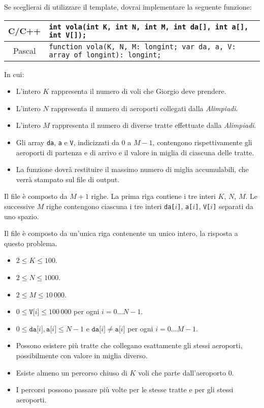 Se sceglierai di utilizzare il template, dovrai implementare la seguente funzione:
\begin{center}\begin{tabularx}{\textwidth}{|c|X|}
\hline
C/C++  & \verb|int vola(int K, int N, int M, int da[], int a[], int V[]);|\\
\hline
Pascal & \verb|function vola(K, N, M: longint; var da, a, V: array of longint): longint;|\\
\hline
\end{tabularx}\end{center}
In cui:
\begin{itemize}[nolistsep]
  \item L'intero $K$ rappresenta il numero di voli che Giorgio deve prendere.
  \item L'intero $N$ rappresenta il numero di aeroporti collegati dalla \emph{Alimpiadi}.
  \item L'intero $M$ rappresenta il numero di diverse tratte effettuate dalla \emph{Alimpiadi}.
  \item Gli array \texttt{da}, \texttt{a} e \texttt{V}, indicizzati da $0$ a $M-1$, contengono rispettivamente gli aeroporti di partenza e di arrivo e il valore in miglia di ciascuna delle tratte.
  \item La funzione dovrà restituire il massimo numero di miglia accumulabili, che verrà stampato sul file di output.
\end{itemize}

\InputFile
Il file  è composto da $M+1$ righe. La prima riga contiene i tre interi $K$, $N$, $M$. Le successive $M$ righe contengono ciascuna i tre interi \texttt{da[$i$]}, \texttt{a[$i$]}, \texttt{V[$i$]} separati da uno spazio.

\OutputFile
Il file \outputfile{} è composto da un'unica riga contenente un unico intero, la risposta a questo problema.

\Constraints
\begin{itemize}[nolistsep, itemsep=2mm]
	\item $2 \le K \le 100$.
	\item $2 \le N \le 1000$.
	\item $2 \le M \le 10\,000$.
	\item $0 \le \texttt{V[$i$]} \le 100\,000$ per ogni $i=0\ldots N-1$.
	\item $0 \le \texttt{da[$i$]}, \texttt{a[$i$]} \le N-1$ e $\texttt{da[$i$]} \neq \texttt{a[$i$]}$ per ogni $i = 0 \ldots M-1$.
	\item Possono esistere pi\`u tratte che collegano esattamente gli stessi aeroporti, possibilmente con valore in miglia diverso.
	\item Esiste almeno un percorso chiuso di $K$ voli che parte dall'aeroporto $0$.
	\item I percorsi possono passare pi\`u volte per le stesse tratte e per gli stessi aeroporti.
\end{itemize}

